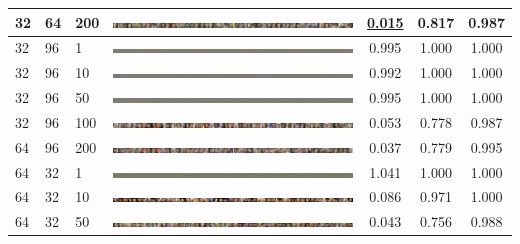 \documentclass[a4paper]{article}
\begin{document}
\begin{table}[h!]
\begin{center}
{\begin{tabular}{lllcccc}
      32 & 64 & 200 & \includegraphics[width=\textwidth,trim={1536px 0 0 0},clip]{figures/faces_g32_d64_ep200_generator.jpg}  & \underline{\bf 0.015} & 0.817 & 0.987\\
      \hline
      32 & 96 & 1   & \includegraphics[width=\textwidth,trim={1536px 0 0 0},clip]{figures/faces_g32_d96_ep1_generator.jpg}    & 0.995 & 1.000 & 1.000\\
      32 & 96 & 10  & \includegraphics[width=\textwidth,trim={1536px 0 0 0},clip]{figures/faces_g32_d96_ep10_generator.jpg}   & 0.992 & 1.000 & 1.000\\
      32 & 96 & 50  & \includegraphics[width=\textwidth,trim={1536px 0 0 0},clip]{figures/faces_g32_d96_ep50_generator.jpg}   & 0.995 & 1.000 & 1.000\\
      32 & 96 & 100 & \includegraphics[width=\textwidth,trim={1536px 0 0 0},clip]{figures/faces_g32_d96_ep100_generator.jpg}  & 0.053 & 0.778 & 0.987\\
      64 & 96 & 200 & \includegraphics[width=\textwidth,trim={1536px 0 0 0},clip]{figures/faces_g32_d96_ep200_generator.jpg}  & 0.037 & 0.779 & 0.995\\
      \hline
      64 & 32 & 1   & \includegraphics[width=\textwidth,trim={1536px 0 0 0},clip]{figures/faces_g64_d32_ep1_generator.jpg}    & 1.041 & 1.000 & 1.000\\
      64 & 32 & 10  & \includegraphics[width=\textwidth,trim={1536px 0 0 0},clip]{figures/faces_g64_d32_ep10_generator.jpg}   & 0.086 & 0.971 & 1.000\\
      64 & 32 & 50  & \includegraphics[width=\textwidth,trim={1536px 0 0 0},clip]{figures/faces_g64_d32_ep50_generator.jpg}   & 0.043 & 0.756 & 0.988\\

\end{tabular}}
\end{center}
\end{table}
\end{document}
